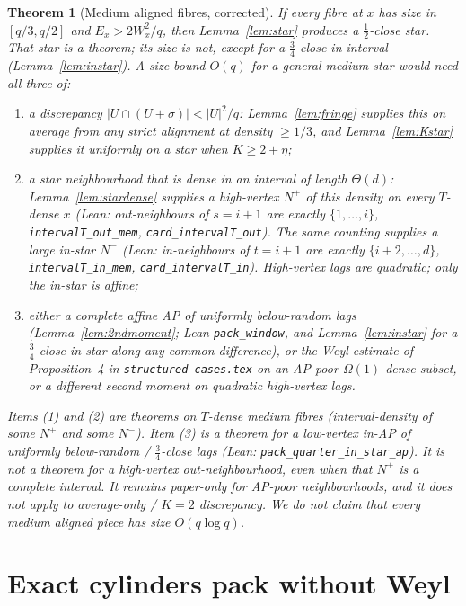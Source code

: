 \documentclass[11pt]{article}
\newtheorem{theorem}{Theorem}
\theoremstyle{definition}
\begin{document}
\begin{theorem}[Medium aligned fibres, corrected]\label{thm:medium}
If every fibre at $x$ has size in $[q/3,q/2]$ and $E_x>2W_x^{2}/q$, then
Lemma~\ref{lem:star} produces a $\tfrac12$-close star.
That star is a theorem; its size is not, except for a
$\tfrac34$-close in-interval (Lemma~\ref{lem:instar}).
A size bound $O(q)$ for a general medium star would need all three of:
\begin{enumerate}
  \item a discrepancy $|U\cap(U+\sigma)|<|U|^{2}/q$: Lemma~\ref{lem:fringe}
        supplies this on average from any strict alignment at density
        $\ge 1/3$, and Lemma~\ref{lem:Kstar} supplies it uniformly on a
        star when $K\ge 2+\eta$;
  \item a star neighbourhood that is dense in an interval of length
        $\Theta(d)$: Lemma~\ref{lem:stardense} supplies a high-vertex
        $N^+$ of this density on every $T$-dense $x$ (Lean:
        out-neighbours of $s=i+1$ are exactly $\{1,\dots,i\}$,
        \texttt{intervalT\_out\_mem}, \texttt{card\_intervalT\_out}).
        The same counting supplies a large in-star $N^-$
        (Lean: in-neighbours of $t=i+1$ are exactly $\{i+2,\dots,d\}$,
        \texttt{intervalT\_in\_mem}, \texttt{card\_intervalT\_in}).
        High-vertex lags are quadratic; only the in-star is affine;
  \item either a complete affine AP of uniformly below-random lags
        (Lemma~\ref{lem:2ndmoment}; Lean \texttt{pack\_window}, and
        Lemma~\ref{lem:instar} for a $\tfrac34$-close in-star along
        any common difference), or the Weyl estimate of
        Proposition~4 in \texttt{structured-cases.tex} on an AP-poor
        $\Omega(1)$-dense subset, or a different second moment on
        quadratic high-vertex lags.
\end{enumerate}
Items (1) and (2) are theorems on $T$-dense medium fibres
(interval-density of some $N^+$ and some $N^-$).
Item (3) is a theorem for a low-vertex in-AP of uniformly
below-random / $\tfrac34$-close lags (Lean:
\texttt{pack\_quarter\_in\_star\_ap}).
It is \emph{not} a theorem for a high-vertex out-neighbourhood, even
when that $N^+$ is a complete interval.
It remains paper-only for AP-poor neighbourhoods, and it does not
apply to average-only / $K=2$ discrepancy.
We do \emph{not} claim that every medium aligned piece has size $O(q\log q)$.
\end{theorem}

\section{Exact cylinders pack without Weyl}
\end{document}
